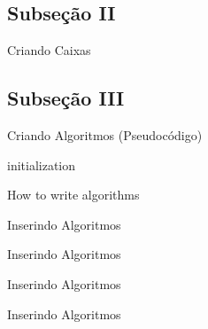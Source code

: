 \documentclass{libs/ufc_format}
\begin{document}
\subsection{Subseção II}
\begin{frame}{Criando Caixas}

    \pause


    \pause

\end{frame}

\subsection{Subseção III}
\begin{frame}{Criando Algoritmos (Pseudocódigo)}
    \begin{algorithm}[H]
        \SetAlgoLined
        \LinesNumbered
         initialization\;
         \caption{How to write algorithms}
    \end{algorithm}
\end{frame}

    

\begin{frame}{Inserindo Algoritmos}
    \lstset{language=Python}
    
\end{frame}

\begin{frame}{Inserindo Algoritmos}
    
\end{frame}

\begin{frame}{Inserindo Algoritmos}
    
\end{frame}

\begin{frame}{Inserindo Algoritmos}
    
\end{frame}
\end{document}
